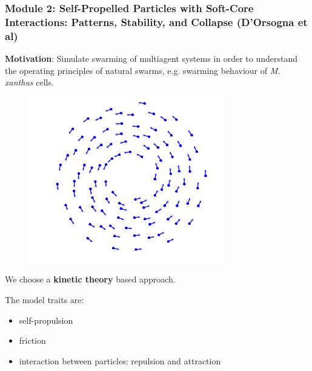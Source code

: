 \documentclass[compress]{beamer}
\begin{document}


\begin{frame}
  \frametitle{Module 2: Self-Propelled Particles with Soft-Core Interactions: Patterns, Stability, and Collapse (D'Orsogna et al)}
  
  \textbf{Motivation}: Simulate swarming of multiagent systems in order to understand the operating principles of natural swarms, e.g. swarming behaviour of \textit{M. xanthus} cells. \\ 
  
  
  \begin{figure}
  		\includegraphics[width=0.18\columnwidth]{./img/mill.png}
  		\label{mill}
  \end{figure}



  We choose a \textbf{kinetic theory} based approach.\\

\hspace{3cm}

  The model traits are:
  \begin{itemize}
  	\item self-propulsion
  	\item friction 
  	\item interaction between particles: repulsion and attraction
  \end{itemize}
 
%

\end{frame}
\end{document}
